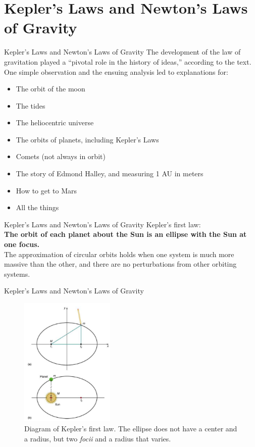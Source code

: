 \documentclass{beamer}
\begin{document}
\section{Kepler's Laws and Newton's Laws of Gravity}

\begin{frame}{Kepler's Laws and Newton's Laws of Gravity}
The development of the law of gravitation played a ``pivotal role in the history of ideas,'' according to the text.  One simple observation and the ensuing analysis led to explanations for: \\
\begin{itemize}
\item The orbit of the moon
\item The tides
\item The \alert{heliocentric universe}
\item The orbits of planets, including Kepler's Laws
\item Comets (not always in orbit)
\item The story of Edmond Halley, and measuring 1 AU in meters
\item How to get to Mars
\item All the things
\end{itemize}
\end{frame}

\begin{frame}{Kepler's Laws and Newton's Laws of Gravity}
Kepler's first law: \\
\vspace{0.5cm}
\textbf{The orbit of each planet about the Sun is an ellipse with the Sun at one focus.} \\
\vspace{0.5cm}
The approximation of circular orbits holds when one system is much more massive than the other, and there are no perturbations from other orbiting systems.
\end{frame}

\begin{frame}{Kepler's Laws and Newton's Laws of Gravity}
\begin{figure}
\centering
\includegraphics[width=0.4\textwidth]{figures/kepler1.png}
\caption{\label{fig:kepler1} Diagram of Kepler's first law.  The ellipse does not have a center and a radius, but two \textit{focii} and a radius that varies.}
\end{figure}
\end{frame}
\end{document}

